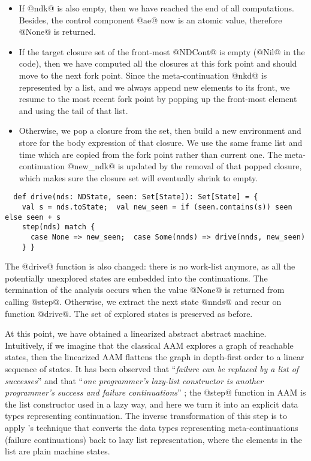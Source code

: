 \documentclass[acmsmall, review]{acmart}\settopmatter{}
\begin{document}
\begin{itemize}
  \item If @ndk@ is also empty, then we have reached the end of all computations. Besides,
    the control component @ae@ now is an atomic value, therefore @None@ is returned.
  \item If the target closure set of the front-most @NDCont@ is empty (@Nil@ in the code),
    then we have computed all the closures at this fork point and should move to the next fork 
    point. Since the meta-continuation @nkd@ is represented by a list, and we always
    append new elements to its front, we resume to the most recent fork point by
    popping up the front-most element and using the tail of that list.
  \item Otherwise, we pop a closure from the set, then build a new environment and store for 
    the body expression of that closure. We use the same frame list and time which are copied 
    from the fork point rather than current one.
    The meta-continuation @new_ndk@ is updated by the removal of that popped closure, which makes
    sure the closure set will eventually shrink to empty.
\end{itemize}

\begin{lstlisting}
  def drive(nds: NDState, seen: Set[State]): Set[State] = {
    val s = nds.toState;  val new_seen = if (seen.contains(s)) seen else seen + s
    step(nds) match {
      case None => new_seen;  case Some(nnds) => drive(nnds, new_seen)
    } }
\end{lstlisting}

The @drive@ function is also changed: there is no work-list anymore, as all the potentially 
unexplored states are embedded into the continuations.
The termination of the analysis occurs when the value @None@ is returned from calling @step@.
Otherwise, we extract the next state @nnds@ and recur on function @drive@.
The set of explored states is preserved as before.

At this point, we have obtained a linearized abstract abstract machine. 
Intuitively, if we imagine that the classical AAM explores a graph of reachable states, 
then the linearized AAM flattens the graph in depth-first order to a linear sequence of states.
It has been observed that ``\textit{failure can be replaced by a list of successes}''
\cite{10.1007/3-540-15975-4_33} and that ``\textit{one programmer’s lazy-list 
constructor is another programmer’s success and failure continuations}'' \cite{danvy2006a}; 
the @step@ function in AAM is the list constructor used in a lazy way, and here we turn it 
into an explicit data types representing continuation.
The inverse transformation of this step is to apply \citeauthor{10.1007/3-540-15975-4_33}'s 
technique that converts the data types representing meta-continuations (failure continuations) 
back to lazy list representation, where the elements in the list are plain machine states.
\end{document}
